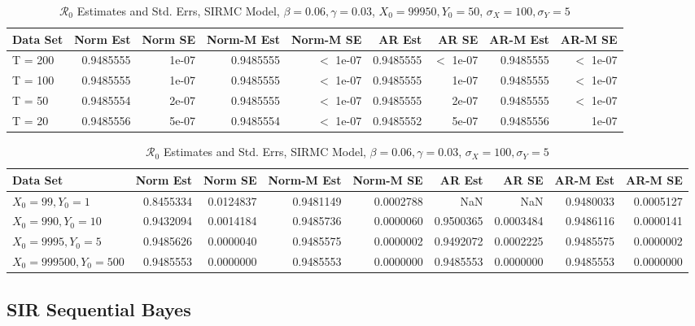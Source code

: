 \documentclass[12pt]{article}
\newcommand{\rr}{\ensuremath{\mathcal{R}_0}}
\begin{document}
\begin{table}[H]
	
	\caption{\label{tab:}$\rr$ Estimates and Std. Errs, SIRMC Model,
		$\beta = 0.06, \gamma = 0.03$, $X_0 = 99950, Y_0 = 50$, $\sigma_X = 100, \sigma_Y = 5$}
	\centering
	\begin{tabular}[t]{l|r|r|r|r|r|r|r|r}
		\hline
		Data Set & Norm Est & Norm SE & Norm-M Est & Norm-M SE & AR Est & AR SE & AR-M Est & AR-M SE\\
		\hline
		T = 200 & 0.9485555 & 1e-07 & 0.9485555 & $<$ 1e-07 & 0.9485555 & $<$ 1e-07 & 0.9485555 & $<$ 1e-07\\
		\hline
		T = 100 & 0.9485555 & 1e-07 & 0.9485555 & $<$ 1e-07 & 0.9485555 & 1e-07 & 0.9485555 & $<$ 1e-07\\
		\hline
		T = 50 & 0.9485554 & 2e-07 & 0.9485555 & $<$ 1e-07 & 0.9485555 & 2e-07 & 0.9485555 & $<$ 1e-07\\
		\hline
		T = 20 & 0.9485556 & 5e-07 & 0.9485554 & $<$ 1e-07 & 0.9485552 & 5e-07 & 0.9485556 & 1e-07\\
		\hline
	\end{tabular}
\end{table}

\begin{table}[H]
	
	\caption{\label{tab:}$\rr$ Estimates and Std. Errs, SIRMC Model,
		$\beta = 0.06, \gamma = 0.03$, $\sigma_X = 100, \sigma_Y = 5$}
	\centering
	\begin{tabular}[t]{l|r|r|r|r|r|r|r|r}
		\hline
		Data Set & Norm Est & Norm SE & Norm-M Est & Norm-M SE & AR Est & AR SE & AR-M Est & AR-M SE\\
		\hline
		$X_0 = 99, Y_0 = 1$ & 0.8455334 & 0.0124837 & 0.9481149 & 0.0002788 & NaN & NaN & 0.9480033 & 0.0005127\\
		\hline
		$X_0 = 990, Y_0 = 10$ & 0.9432094 & 0.0014184 & 0.9485736 & 0.0000060 & 0.9500365 & 0.0003484 & 0.9486116 & 0.0000141\\
		\hline
		$X_0 = 9995, Y_0 = 5$ & 0.9485626 & 0.0000040 & 0.9485575 & 0.0000002 & 0.9492072 & 0.0002225 & 0.9485575 & 0.0000002\\
		\hline
		$X_0 = 999500, Y_0 = 500$ & 0.9485553 & 0.0000000 & 0.9485553 & 0.0000000 & 0.9485553 & 0.0000000 & 0.9485553 & 0.0000000\\
		\hline
	\end{tabular}
\end{table}

\subsection{SIR Sequential Bayes}
\end{document}
